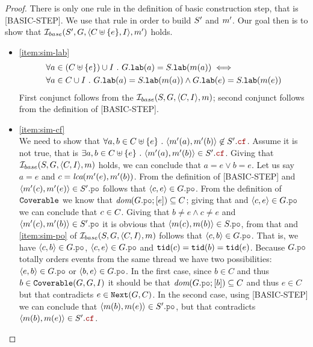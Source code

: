 \documentclass[12pt]{article}
\begin{document}
\begin{proof}
  There is only one rule in the definition of basic construction step, that is [BASIC-STEP].
  We use that rule in order to build $S'$ and $m'$.
  Our goal then is to show that $\mathcal{I}_{base}(S', G, \langle C \uplus \{e\}, I \rangle, m')$ holds.
  
  \begin{itemize}
  \item \ref{item:sim-lab}
    \begin{equation}
      \begin{split}
        & \forall{a \in (C\uplus \{e\}) \cup I} ~.~ G.{\mathtt{lab}}(a) = S.{\mathtt{lab}}(m(a)) \iff \\
        & \forall{a \in C\cup I} ~.~ G.{\mathtt{lab}}(a) = S.{\mathtt{lab}}(m(a)) \wedge
        G.{\mathtt{lab}}(e) = S.{\mathtt{lab}}(m(e))
      \end{split}
    \end{equation}
    First conjunct follows from the $\mathcal{I}_{base}(S, G, \langle C, I \rangle, m)$;
    second conjunct follows from the definition of [BASIC-STEP].

  \item \ref{item:sim-cf} \\
    We need to show that
    $\forall{a, b \in \lC \uplus \{e\}} ~.~ \tup{\lM'(a), \lM'(b)} \not\in \lES'.\lCF$.
    Assume it is not true, that is
    $\exists{a, b \in \lC \uplus \{e\}} ~.~ \tup{\lM'(a), \lM'(b)} \in \lES'.\lCF$.
    Giving that $\mathcal{I}_{base}(S, G, \langle C, I \rangle, m)$ holds,
    we can conclude that $a = e \vee b = e$.
    Let us say $a = e$ and $c = \textit{lca}(m'(e), m'(b))$.
    From the definition of [BASIC-STEP] and 
    $\tup{\lM'(c), \lM'(e)} \in \lES'.\lPO$ follows that $\tup{c, e} \in \lG.\lPO$.
    From the definition of ${\mathtt{Coverable}}$ we know that $\dom{\lG.\lPO;[e]} \subseteq \lC$;
    giving that and $\tup{c, e} \in \lG.\lPO$ we can conclude that $c \in C$.
    Giving that $b \neq e \wedge c \neq e$ and $\tup{\lM'(c), \lM'(b)} \in \lES'.\lPO$
    it is obvious that $\tup{\lM(c), \lM(b)} \in \lES.\lPO$,
    from that and \ref{item:sim-po} of $\mathcal{I}_{base}(S, G, \langle C, I \rangle, m)$
    follows that $\tup{c, b} \in \lG.\lPO$.
    That is, we have $\tup{c, b} \in \lG.\lPO$, $\tup{c, e} \in \lG.\lPO$
    and ${\mathtt{tid}}(c) = {\mathtt{tid}}(b) = {\mathtt{tid}}(e)$.
    Because $\lG.\lPO$ totally orders events from the same thread
    we have two possibilities: $\tup{e, b} \in \lG.\lPO$ or $\tup{b, e} \in \lG.\lPO$.
    In the first case, since $b \in C$ and thus $b \in {\mathtt{Coverable}}(G, G, I)$
    it should be that $\dom{\lG.\lPO;[b]} \subseteq \lC$ and thus $e \in C$
    but that contradicts $e \in {\mathtt{Next}}(G, C)$.
    In the second case, using [BASIC-STEP]
    we can conclude that $\tup{\lM(b), \lM(e)} \in \lES'.\lPO$,
    but that contradicts $\tup{\lM(b), \lM(e)} \in \lES'.\lCF$.


\end{itemize}
\end{proof}
\end{document}
